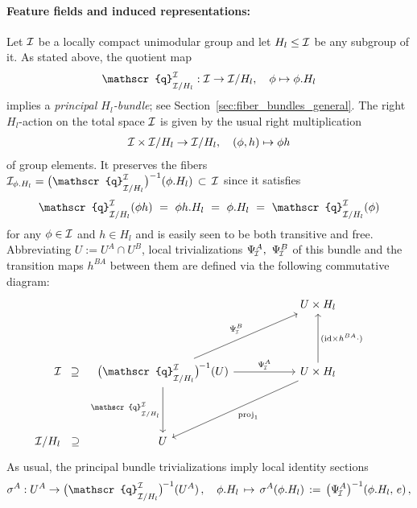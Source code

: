 \paragraph{Feature fields and induced representations:}

Let $\mathcal{I}$ be a locally compact unimodular group and let $H_l\leq\mathcal{I}$ be any subgroup of it.
As stated above, the quotient map
\begin{align}
    \mathscr{q}^{\I}_{\overset{}{\I/H_l}}: \I \to \I/H_l, \quad \phi \mapsto \phi.H_l
\end{align}
implies a \emph{principal $H_l$-bundle}; see Section~\ref{sec:fiber_bundles_general}.
The right $H_l$-action on the total space $\mathcal{I}$ is given by the usual right multiplication
\begin{align}
    \mathcal{I} \times \mathcal{I}/H_l \to \mathcal{I}/H_l, \quad (\phi,h) \mapsto \phi h
\end{align}
of group elements.
It preserves the fibers $\I_{\phi.H_l} = \big( \mathscr{q}^{\I}_{\overset{}{\I/H_l}} \big)^{-1} (\phi.H_l) \,\subset\, \I$ since it satisfies
\begin{align}
    \mathscr{q}^{\I}_{\overset{}{\I/H_l}} (\phi h)
    \ =\ \phi h.H_l\ =\ \phi.H_l
    \ =\ \mathscr{q}^{\I}_{\overset{}{\I/H_l}} (\phi)
\end{align}
for any $\phi\in\mathcal{I}$ and $h\in H_l$ and is easily seen to be both transitive and free.
Abbreviating $U := U^A \cap U^B$, local trivializations $\PsiI^A,\ \PsiI^B$ of this bundle and the transition maps $h^{BA}$ between them are defined via the following commutative diagram:
\begin{equation}
\begin{tikzcd}[row sep=4.em, column sep=5.5em]
    &[-6.5em]
    & U\times H_l
    \\
      \I\ \: \supseteq
    & \big(\mathscr{q}^{\I}_{\overset{}{\I/H_l}} \big)^{\mkern-2mu-1}(U)
                    \arrow[d, swap, "\mathscr{q}^{\I}_{\overset{}{\I/H_l}}"]
                    \arrow[r, "\PsiI^A"]
                    \arrow[ru, "\PsiI^B"]
    & U\times H_l   \arrow[u, swap, "(\id\times h^{BA}\cdot)"]
                    \arrow[ld, "\proj_1"]
    \\
      \I/H_l\ \ \supseteq \mkern30mu
    & U
\end{tikzcd}
\qquad
\end{equation}
As usual, the principal bundle trivializations imply local identity sections
\begin{align}
    \sigma^A: U^A \to \big(\mathscr{q}^{\I}_{\overset{}{\I/H_l}} \big)^{\mkern-2mu-1}(U^A) \,, \quad 
    \phi.H_l \,\mapsto\, \sigma^A (\phi.H_l) \,:=\, \big(\PsiI^A \big)^{-1} (\phi.H_l,\, e) \,,
\end{align}
